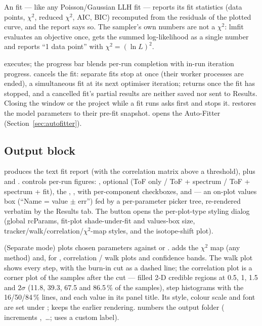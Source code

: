 An  fit --- like any Poisson/Gaussian LLH fit ---
reports its fit statistics (data points, $\chi^2$, reduced $\chi^2$,
AIC, BIC) recomputed from the residuals of the plotted curve, and the
report says so. The sampler's own numbers are not a $\chi^2$: lmfit
evaluates an  objective once, gets the summed
log-likelihood as a single number and reports ``1 data point'' with
$\chi^2 = (\ln L)^2$.

 executes; the progress bar blends per-run completion
with in-run iteration progress.  cancels the fit:
separate fits stop at once (their worker processes are ended), a
simultaneous fit at its next optimiser iteration; 
returns once the fit has stopped, and a cancelled fit's partial
results are neither saved nor sent to Results. Closing the window or
the project while a fit runs asks first and stops it.
 restores the model parameters to their pre-fit
snapshot.  opens the Auto-Fitter
(Section~\ref{sec:autofitter}).

\subsection{Output block}

 produces the text fit report (with the correlation
matrix above a  threshold), plus  and
.  controls per-run figures:
, optional  (ToF only /
ToF + spectrum / ToF + spectrum + fit), the ,
,  with
per-component checkboxes, and  --- an
on-plot values box (``Name = value $\pm$ err'') fed by a
per-parameter picker tree, re-rendered verbatim by the Results tab.
The  button opens the per-plot-type styling
dialog (global rcParams, fit-plot shade-under-fit and values-box
size, tracker/walk/correlation/$\chi^2$-map styles, and the
isotope-shift plot).

 (Separate mode) plots chosen parameters against
 or .  adds the
$\chi^2$ map (any method) and, for , correlation / walk
plots and confidence bands. The walk plot shows every step, with the
burn-in cut as a dashed line; the correlation plot is a corner plot of
the samples after the cut --- filled 2-D credible regions at 0.5, 1,
1.5 and $2\sigma$ (11.8, 39.3, 67.5 and 86.5\,\% of the samples), step
histograms with the 16/50/84\,\% lines, and each value in its panel
title. Its style, colour scale and font are set under
;  keeps the
earlier rendering.  numbers the output
folder ( increments ,~\dots; 
uses a custom label).

